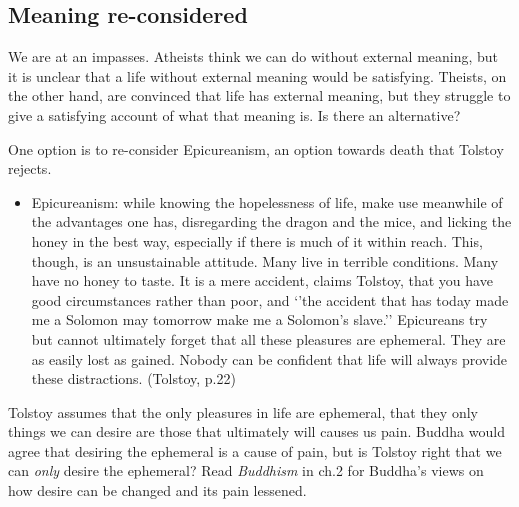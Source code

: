 \documentclass[]{article}
\begin{document}
\subsection{Meaning re-considered}\label{meaning-re-considered}

We are at an impasses. Atheists think we can do without external
meaning, but it is unclear that a life without external meaning would be
satisfying. Theists, on the other hand, are convinced that life has
external meaning, but they struggle to give a satisfying account of what
that meaning is. Is there an alternative?

One option is to re-consider Epicureanism, an option towards death that
Tolstoy rejects.

\begin{itemize}
\itemsep1pt\parskip0pt
\item
  Epicureanism: while knowing the hopelessness of life, make use
  meanwhile of the advantages one has, disregarding the dragon and the
  mice, and licking the honey in the best way, especially if there is
  much of it within reach. This, though, is an unsustainable attitude.
  Many live in terrible conditions. Many have no honey to taste. It is a
  mere accident, claims Tolstoy, that you have good circumstances rather
  than poor, and `'the accident that has today made me a Solomon may
  tomorrow make me a Solomon's slave.'' Epicureans try but cannot
  ultimately forget that all these pleasures are ephemeral. They are as
  easily lost as gained. Nobody can be confident that life will always
  provide these distractions. (Tolstoy, p.22)
\end{itemize}

Tolstoy assumes that the only pleasures in life are ephemeral, that they
only things we can desire are those that ultimately will causes us pain.
Buddha would agree that desiring the ephemeral is a cause of pain, but
is Tolstoy right that we can \emph{only} desire the ephemeral? Read
\emph{Buddhism} in ch.2 for Buddha's views on how desire can be changed
and its pain lessened.
\end{document}
